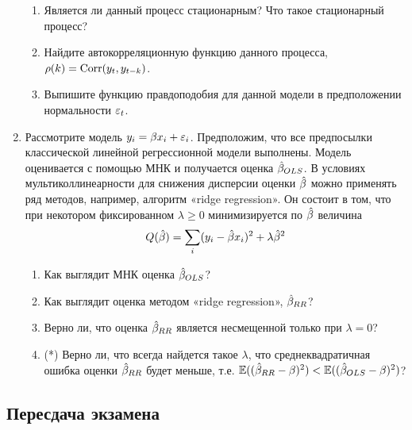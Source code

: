 \documentclass[12pt, a4paper]{article}
\begin{document}
\begin{enumerate}
\begin{enumerate}
\item Является ли данный процесс стационарным? Что такое стационарный процесс?
\item Найдите автокорреляционную функцию данного процесса, $\rho(k)=\operatorname{Corr}(y_t,y_{t-k})$.
\item Выпишите функцию правдоподобия для данной модели в предположении нормальности $\varepsilon_t$.
\end{enumerate}



\item Рассмотрите модель $y_i=\beta x_i+\varepsilon_i$. Предположим, что все предпосылки классической линейной регрессионной модели выполнены. Модель оценивается с помощью МНК и получается оценка $\hat{\beta}_{OLS}$.
В условиях мультиколлинеарности для снижения дисперсии оценки $\hat{\beta}$ можно применять ряд методов, например, алгоритм «ridge regression». Он состоит в том, что при некотором фиксированном $\lambda\geq 0$ минимизируется по $\hat{\beta}$ величина
\[
Q(\hat{\beta})=\sum_i (y_i-\hat{\beta} x_i)^2+\lambda \hat{\beta}^2
\]
\begin{enumerate}
\item Как выглядит МНК оценка $\hat{\beta}_{OLS}$?
\item Как выглядит оценка методом «ridge regression», $\hat{\beta}_{RR}$?
\item Верно ли, что оценка $\hat{\beta}_{RR}$ является несмещенной только при $\lambda=0$?
\item (*) Верно ли, что всегда найдется такое $\lambda$, что среднеквадратичная ошибка оценки $\hat{\beta}_{RR}$ будет меньше, т.е. $\mathbb{E}((\hat{\beta}_{RR}-\beta)^2)<\mathbb{E}((\hat{\beta}_{OLS}-\beta)^2)$?
\end{enumerate}


\end{enumerate}


\subsection{Пересдача экзамена}
\end{document}
